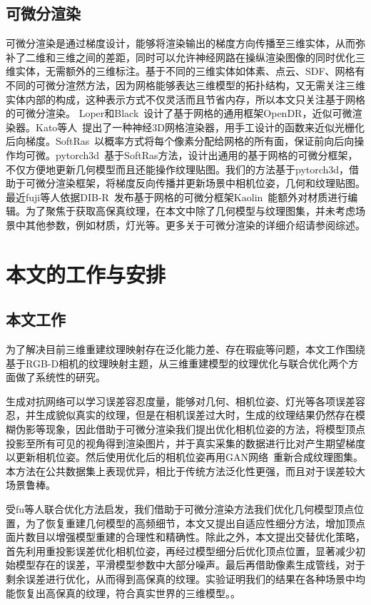 \subsection{可微分渲染}
可微分渲染是通过梯度设计，能够将渲染输出的梯度方向传播至三维实体，从而弥补了二维和三维之间的差距，同时可以允许神经网路在操纵渲染图像的同时优化三维实体，无需额外的三维标注。基于不同的三维实体如体素、点云、SDF、网格有不同的可微分渲然方法，因为网格能够表达三维模型的拓扑结构，又无需关注三维实体内部的构成，这种表示方式不仅灵活而且节省内存，所以本文只关注基于网格的可微分渲染。
Loper和Black~\cite{MatthewLoper2014OpenDRAA}设计了基于网格的通用框架OpenDR，近似可微渲染器。Kato等人~\cite{MatthiasNiener2013Realtime3R}提出了一种神经3D网格渲染器，用手工设计的函数来近似光栅化后向梯度。SoftRas~\cite{ShichenLiu2019SoftRA}以概率方式将每个像素分配给网格的所有面，保证前向后向操作均可微。pytorch3d~\cite{ravi2020pytorch3d}基于SoftRas方法，设计出通用的基于网格的可微分框架，不仅方便地更新几何模型而且还能操作纹理贴图。我们的方法基于pytorch3d，借助于可微分渲染框架，将梯度反向传播并更新场景中相机位姿，几何和纹理贴图。最近fuji等人依据DIB-R~\cite{chen2019_dibr}发布基于网格的可微分框架Kaolin~\cite{KaolinLibrary}能额外对材质进行编辑。为了聚焦于获取高保真纹理，在本文中除了几何模型与纹理图集，并未考虑场景中其他参数，例如材质，灯光等。更多关于可微分渲染的详细介绍请参阅综述\cite{HiroharuKato2020DifferentiableRA}。
\section{本文的工作与安排}

\subsection{本文工作}
为了解决目前三维重建纹理映射存在泛化能力差、存在瑕疵等问题，本文工作围绕基于RGB-D相机的纹理映射主题，从三维重建模型的纹理优化与联合优化两个方面做了系统性的研究。\par
生成对抗网络可以学习误差容忍度量，能够对几何、相机位姿、灯光等各项误差容忍，并生成貌似真实的纹理，但是在相机误差过大时，生成的纹理结果仍然存在模糊伪影等现象，因此借助于可微分渲染我们提出优化相机位姿的方法，将模型顶点投影至所有可见的视角得到渲染图片，并于真实采集的数据进行比对产生期望梯度以更新相机位姿。然后使用优化后的相机位姿再用GAN网络~\cite{chanmonteiro2020pi-GAN}重新合成纹理图集。本方法在公共数据集上表现优异，相比于传统方法泛化性更强，而且对于误差较大场景鲁棒。\par
受fu等人联合优化方法启发，我们借助于可微分渲染方法我们优化几何模型顶点位置，为了恢复重建几何模型的高频细节，本文又提出自适应性细分方法，增加顶点面片数目以增强模型重建的合理性和精确性。除此之外，本文提出交替优化策略，首先利用重投影误差优化相机位姿，再经过模型细分后优化顶点位置，显著减少初始模型存在的误差，平滑模型参数中大部分噪声。最后再借助像素生成管线，对于剩余误差进行优化，从而得到高保真的纹理。实验证明我们的结果在各种场景中均能恢复出高保真的纹理，符合真实世界的三维模型。。
